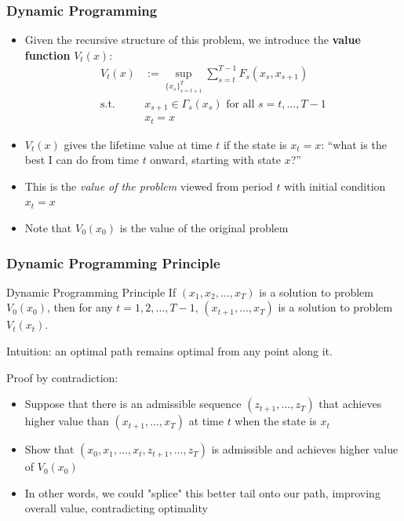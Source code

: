 \documentclass[9pt,aspectratio=169]{beamer}
\begin{document}
\begin{frame}
    \frametitle{Dynamic Programming}
    \begin{itemize}
        \item Given the recursive structure of this problem, we introduce
        the \textbf{value function} $V_t(x)$:
        \begin{align*}
            V_t(x) &:= \sup_{\{x_s\}_{s=t+1}^{T}} \sum_{s=t}^{T-1}F_s(x_s, x_{s+1})\\
            \text{s.t. } &x_{s+1} \in \Gamma_s(x_s) \text{ for all } s = t,
            \ldots, T-1\\
            &x_t = x
        \end{align*}
        \item $V_t(x)$ gives the lifetime value at time $t$ if the state is
        $x_t = x$: ``what is the best I can do from time $t$ onward, starting
        with state $x$?''
        \item This is the \emph{value of the problem} viewed from period $t$
        with initial condition $x_t = x$
        \item Note that $V_0(x_0)$ is the value of the original problem
    \end{itemize}
\end{frame}

\begin{frame}
    \frametitle{Dynamic Programming Principle}
    \begin{block}{Dynamic Programming Principle}
        If $(x_1, x_2, \ldots, x_T)$ is a solution to problem $V_0(x_0)$,
        then for any $t = 1, 2, \ldots, T-1$, $(x_{t+1}, \ldots, x_T)$ is a
        solution to problem $V_t(x_t)$.
    \end{block}
    Intuition: an optimal path remains optimal from any point along it.
    
    Proof by contradiction:
    \begin{itemize}
        \item Suppose that there is an admissible sequence $(z_{t+1}, \ldots,
        z_T)$ that achieves higher value than $(x_{t+1}, \ldots, x_T)$ at
        time $t$ when the state is $x_t$
        \item Show that $(x_0, x_1, \ldots, x_t, z_{t+1}, \ldots, z_T)$ is
        admissible and achieves higher value of $V_0(x_0)$
        \item In other words, we could "splice" this better tail onto our
        path, improving overall value, contradicting optimality
    \end{itemize}
\end{frame}
\end{document}
